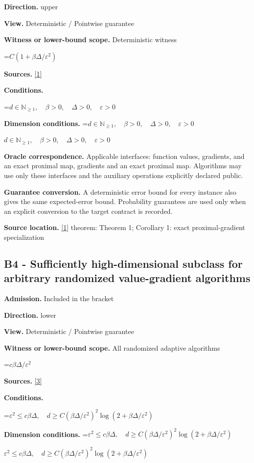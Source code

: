 \documentclass[10pt,a4paper]{article}
\newcommand{\AtlasMath}[1]{\par\begingroup\centering\setbox0=\hbox{$\displaystyle #1$}\ifdim\wd0>1.4\linewidth\typeout{ATLAS WIDE FORMULA: \the\wd0}\fi\ifdim\wd0>\linewidth\resizebox{\linewidth}{!}{\box0}\else\box0\fi\par\endgroup}
\newcommand{\AtlasInlineMath}[1]{\begingroup\setbox0=\hbox{$#1$}\ifdim\wd0>.4\linewidth\endgroup\AtlasMath{#1}\else\endgroup$#1$\fi}
\begin{document}
\textbf{Direction.} upper

\textbf{View.} Deterministic / Pointwise guarantee

\textbf{Witness or lower-bound scope.} Deterministic witness

\AtlasMath{C(1+\beta\Delta/\varepsilon^2)}
\textbf{Sources.} \href{https://arxiv.org/pdf/1308.6594}{[1]}

\textbf{Conditions.} 
\AtlasMath{d\in\mathbb{N}_{\ge1},\quad \beta>0,\quad \Delta>0,\quad \varepsilon>0}


\textbf{Dimension conditions.} \AtlasInlineMath{d\in\mathbb{N}_{\ge1},\quad \beta>0,\quad \Delta>0,\quad \varepsilon>0}

\textbf{Oracle correspondence.} Applicable interfaces: function values, gradients, and an exact proximal map, gradients and an exact proximal map. Algorithms may use only these interfaces and the auxiliary operations explicitly declared public.

\textbf{Guarantee conversion.} A deterministic error bound for every instance also gives the same expected-error bound. Probability guarantees are used only when an explicit conversion to the target contract is recorded.

\textbf{Source location.} \href{https://arxiv.org/pdf/1308.6594}{[1]} theorem: Theorem 1; Corollary 1: exact proximal-gradient specialization

\subsection{B4 - Sufficiently high-dimensional subclass for arbitrary randomized value-gradient algorithms}
\textbf{Admission.} Included in the bracket

\textbf{Direction.} lower

\textbf{View.} Deterministic / Pointwise guarantee

\textbf{Witness or lower-bound scope.} All randomized adaptive algorithms

\AtlasMath{c\beta\Delta/\varepsilon^2}
\textbf{Sources.} \href{https://arxiv.org/pdf/1710.11606}{[3]}

\textbf{Conditions.} 
\AtlasMath{\varepsilon^2\le c\beta\Delta,\quad d\ge C(\beta\Delta/\varepsilon^2)^2\log(2+\beta\Delta/\varepsilon^2)}


\textbf{Dimension conditions.} \AtlasInlineMath{\varepsilon^2\le c\beta\Delta,\quad d\ge C(\beta\Delta/\varepsilon^2)^2\log(2+\beta\Delta/\varepsilon^2)}
\end{document}
